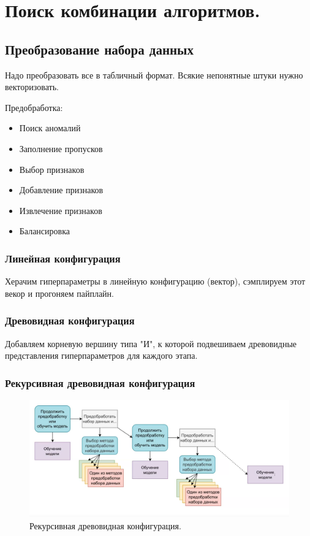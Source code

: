 \section{Поиск комбинации алгоритмов.}

\subsection*{Преобразование набора данных}

Надо преобразовать все в табличный формат. Всякие непонятные
штуки нужно векторизовать.

Предобработка:
\begin{itemize}
    \item Поиск аномалий
    \item Заполнение пропусков
    \item Выбор признаков
    \item Добавление признаков
    \item Извлечение признаков
    \item Балансировка
\end{itemize}

\subsubsection*{Линейная конфигурация}

Херачим гиперпараметры в линейную конфигурацию (вектор),
сэмплируем этот векор и прогоняем пайплайн.

\subsubsection*{Древовидная конфигурация}

Добавляем корневую вершину типа "И", к которой подвешиваем
древовидные представления гиперпараметров для каждого этапа.

\subsubsection*{Рекурсивная древовидная конфигурация}

\begin{figure}[H]
	\centering
	\includegraphics[scale=0.3]{images/rectree}
	\caption{Рекурсивная древовидная конфигурация.}
\end{figure}

